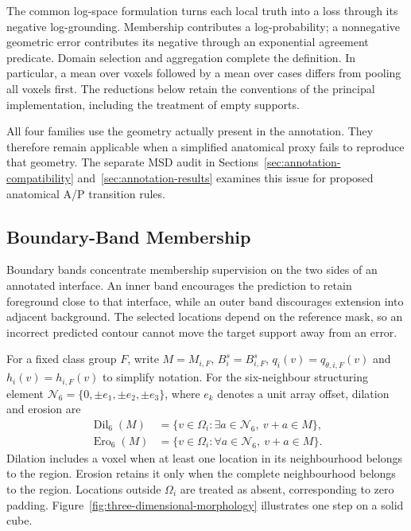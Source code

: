 \documentclass[12pt,a4paper]{article}
\begin{document}
The common log-space formulation turns each local truth into a loss
through its negative log-grounding. Membership contributes a
log-probability; a nonnegative geometric error contributes its negative
through an exponential agreement predicate. Domain selection and
aggregation complete the definition. In particular, a mean over voxels
followed by a mean over cases differs from pooling all voxels first.
The reductions below retain the conventions of the principal
implementation, including the treatment of empty supports.

All four families use the geometry actually present in the annotation.
They therefore remain applicable when a simplified anatomical proxy
fails to reproduce that geometry. The separate MSD audit in
Sections~\ref{sec:annotation-compatibility} and~\ref{sec:annotation-results}
examines this issue for proposed anatomical A/P transition rules.

\subsection{Boundary-Band Membership}\label{sec:boundary-band-constraints}

Boundary bands concentrate membership supervision on the two sides of an
annotated interface. An inner band encourages the prediction to retain
foreground close to that interface, while an outer band discourages
extension into adjacent background. The selected locations depend on the
reference mask, so an incorrect predicted contour cannot move the target
support away from an error.

For a fixed class group $F$, write $M=M_{i,F}$, $B_i^s=B_{i,F}^s$,
$q_i(v)=q_{\theta,i,F}(v)$ and $h_i(v)=h_{i,F}(v)$ to simplify notation.
For the six-neighbour structuring element
$\mathcal N_6=\{0,\pm e_1,\pm e_2,\pm e_3\}$, where $e_k$ denotes
a unit array offset, dilation and erosion are
\begin{equation}
\begin{aligned}
\operatorname{Dil}_6(M)
 &=\{v\in\Omega_i:\exists a\in\mathcal{N}_6,\ v+a\in M\},\\
\operatorname{Ero}_6(M)
 &=\{v\in\Omega_i:\forall a\in\mathcal{N}_6,\ v+a\in M\}.
\end{aligned}
\label{eq:band-morphology}
\end{equation}
Dilation includes a voxel when at least one location in its neighbourhood
belongs to the region. Erosion retains it only when the complete
neighbourhood belongs to the region. Locations outside $\Omega_i$ are
treated as absent, corresponding to zero padding.
Figure~\ref{fig:three-dimensional-morphology} illustrates one step on
a solid cube.
\end{document}

